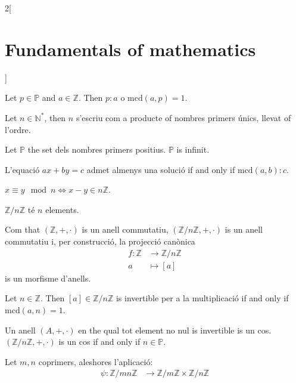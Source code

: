 \documentclass[../../../main.tex]{subfiles}
\begin{document}
\begin{multicols}{2}[\section{Fundamentals of mathematics}]
\begin{theorem}
    \end{theorem}
    \begin{lemma}
    Let $p\in\mathbb{P}$ and $a\in\mathbb{Z}$. Then $p: a$ o $\text{mcd}(a,p)=1$.
    \end{lemma}
    \begin{theorem}
    Let $n\in\mathbb{N}^*$, then $n$ s'escriu com a producte of nombres primers únics, llevat of l'ordre.
    \end{theorem}
    \begin{theorem}
    Let $\mathbb{P}$ the set dels nombres primers positius. $\mathbb{P}$ is infinit. 
    \end{theorem}
    \begin{theorem}
    L'equació $ax+by=c$ admet almenys una solució if and only if $\text{mcd}(a,b): c$.
    \end{theorem}
    \begin{definition}
    $x\equiv y\mod n\iff x-y\in n\mathbb{Z}$.
    \end{definition}
    \begin{lemma}
    $\mathbb{Z}/n\mathbb{Z}$ té $n$ elements.
    \end{lemma}
    \begin{theorem}
    Com that $(\mathbb{Z},+,\cdot)$ is un anell commutatiu, $(\mathbb{Z}/n\mathbb{Z},+,\cdot)$ is un anell commutatiu i, per construcció, la projecció canònica 
    \begin{align*}
        f:\mathbb{Z}&\rightarrow\mathbb{Z}/n\mathbb{Z}\\
        a&\mapsto[a]
    \end{align*}is un morfisme d'anells.
    \end{theorem}
    \begin{lemma}
    Let $n\in\mathbb{Z}$. Then $[a]\in\mathbb{Z}/n\mathbb{Z}$ is invertible per a la multiplicació if and only if $\text{mcd}(a,n)=1$.
    \end{lemma}
    \begin{corollary}
    Un anell $(A,+,\cdot)$ en the qual tot element no nul is invertible is un cos. $(\mathbb{Z}/n\mathbb{Z},+,\cdot)$ is un cos if and only if $n\in\mathbb{P}$.
    \end{corollary}
    \begin{theorem}
    Let $m,n$ coprimers, aleshores l'aplicació:
    \begin{align*}
        \psi:\mathbb{Z}/mn\mathbb{Z}&\rightarrow\mathbb{Z}/m\mathbb{Z}\times\mathbb{Z}/n\mathbb{Z}\\

\end{align*}
\end{theorem}
\end{multicols}
\end{document}
